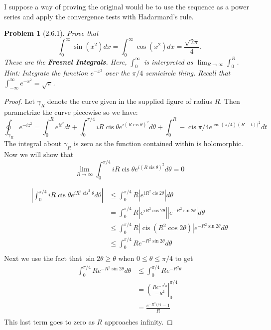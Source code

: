 \documentclass[10pt]{article}
\newcommand{\sk}{\vskip 10mm}
\DeclareMathOperator{\cis}{cis}
\theoremstyle{plain}
\newtheorem{problem}{Problem}
\theoremstyle{remark}
\begin{document}
I suppose a way of proving the original would be to use the sequence
as a power series and apply the convergence tests with Hadarmard's rule.

\sk

\begin{problem}[2.6.1]
  Prove that
  \[
    \int_0^\infty\sin(x^2)dx=\int_0^\infty\cos(x^2)dx=\frac{\sqrt{2\pi}}{4}.
  \]
  These are the \textbf{Fresnel Integrals}. Here, $\int_0^\infty$ is
  interpreted as $\lim_{R\rightarrow\infty}\int_0^R$.\\
  Hint: Integrate the function $e^{-x^2}$ over the $\pi/4$ semicircle
  thing. Recall that $\int_{-\infty}^\infty e^{-x^2}=\sqrt{\pi}$.
\end{problem}

\begin{proof}
  Let $\gamma_R$ denote the curve given in the supplied figure of radius $R$.
  Then parametrize the curve piecewise so we have:
  \[
    \oint_{\gamma_R}e^{-iz^2} = \int_0^Re^{it^2}dt+\int_0^{\pi/4}iR\cis\theta e^{i(R\cis\theta)^2}d\theta +\int_0^R-\cis\pi/4e^{\cis(\pi/4)(R-t))^2 } dt
  \]
  The integral about $\gamma_R$ is zero as the function contained within is holomorphic.
  Now we will show that
  \[
    \lim_{R\rightarrow\infty}\int_0^{\pi/4}iR\cis\theta e^{i(R\cis\theta)^2}d\theta=0
  \]

  \begin{align*}
    \left|\int_0^{\pi/4}iR\cis\theta e^{iR^2\cis^2\theta}d\theta\right| &\leq \int_0^{\pi/4}R\left|e^{iR^2\cis2\theta}\right|d\theta\\
                                                              &= \int_0^{\pi/4}R\left|e^{iR^2\cos2\theta}\right|\left|e^{-R^2\sin2\theta}\right|d\theta\\
                                                              &\leq \int_0^{\pi/4}R|\cis(R^2\cos2\theta)|e^{-R^2\sin2\theta}d\theta\\
                                                              &\leq \int_0^{\pi/4}Re^{-R^2\sin2\theta}d\theta\\
  \end{align*}
  Next we use the fact that $\sin2\theta\geq\theta$ when $0\leq\theta\leq\pi/4$ to get
  \begin{align*}
    \int_0^{\pi/4}Re^{-R^2\sin2\theta}d\theta &\leq \int_0^{\pi/4}Re^{-R^2\theta}\\
                                         &=\left(\frac{Re^{-R^2\theta}}{-R^2}\right|_0^{\pi/4}\\
                                         &=\frac{e^{-R^2\pi/4}-1}{R}\\
  \end{align*}
  This last term goes to zero as $R$ approaches infinity.


\end{proof}
\end{document}

